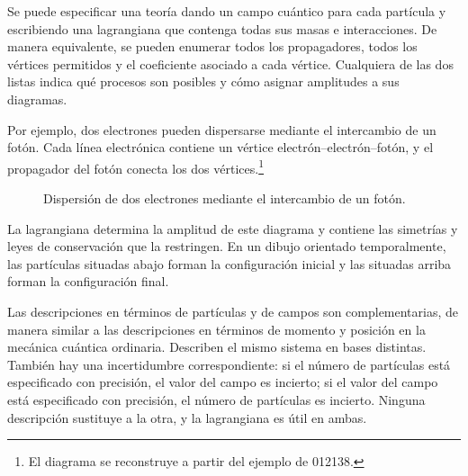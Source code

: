Se puede especificar una teoría dando un campo cuántico para cada partícula y escribiendo una lagrangiana que contenga todas sus masas e interacciones. De manera equivalente, se pueden enumerar todos los propagadores, todos los vértices permitidos y el coeficiente asociado a cada vértice. Cualquiera de las dos listas indica qué procesos son posibles y cómo asignar amplitudes a sus diagramas.

Por ejemplo, dos electrones pueden dispersarse mediante el intercambio de un fotón. Cada línea electrónica contiene un vértice electrón--electrón--fotón, y el propagador del fotón conecta los dos vértices.\footnote{El diagrama se reconstruye a partir del ejemplo de 012138.}

\begin{figure}[htbp]\centering
{}\caption{Dispersión de dos electrones mediante el intercambio de un fotón.}\end{figure}

La lagrangiana determina la amplitud de este diagrama y contiene las simetrías y leyes de conservación que la restringen. En un dibujo orientado temporalmente, las partículas situadas abajo forman la configuración inicial y las situadas arriba forman la configuración final.

\begin{classroomqa}\end{classroomqa}

Las descripciones en términos de partículas y de campos son complementarias, de manera similar a las descripciones en términos de momento y posición en la mecánica cuántica ordinaria. Describen el mismo sistema en bases distintas. También hay una incertidumbre correspondiente: si el número de partículas está especificado con precisión, el valor del campo es incierto; si el valor del campo está especificado con precisión, el número de partículas es incierto. Ninguna descripción sustituye a la otra, y la lagrangiana es útil en ambas.

